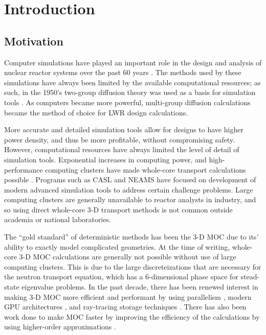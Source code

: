 \chapter{Introduction}{\label{ch:Introduction}
    \section{Motivation}{\label{sec:Introduction:Motivation}
        Computer simulations have played an important role in the design and analysis of nuclear reactor systems over the past 60 years \cite{FewGroupDiffusion}.
        The methods used by these simulations have always been limited by the available computational resources; as such, in the 1950's two-group diffusion theory was used as a basis for simulation tools \cite{FewGroupDiffusion}.
        As computers became more powerful, multi-group diffusion calculations became the method of choice for \ac{LWR} design calculations.

        More accurate and detailed simulation tools allow for designs to have higher power density, and thus be more profitable, without compromising safety.
        However, computational resources have always limited the level of detail of simulation tools.
        Exponential increases in computing power, and high-performance computing clusters have made whole-core transport calculations possible \cite{CASMO-4,Apollo2-2010,DeCART,Denovo,Yang2010,Boyd2014,Collins2016,Gunow2018}.
        Programs such as \ac{CASL} and \ac{NEAMS} have focused on development of modern advanced simulation tools to address certain challenge problems.
        Large computing clusters are generally unavailable to reactor analysts in industry, and so using direct whole-core 3-D transport methods is not common outside academia or national laboratories.

        The ``gold standard'' of deterministic methods has been the 3-D \ac{MOC} \cite{Askew1972} due to its' ability to exactly model complicated geometries.
        At the time of writing, whole-core 3-D \ac{MOC} calculations are generally not possible without use of large computing clusters.
        This is due to the large discreteizations that are necessary for the neutron transport equation, which has a 6-dimensional phase space for stead-state eigenvalue problems.
        In the past decade, there has been renewed interest in making 3-D \ac{MOC} more efficient and performant by using parallelism \cite{Kochunas2013}, modern \ac{GPU} architectures \cite{Boyd2014}, and ray-tracing storage techniques \cite{Sciannandrone2016, Gunow2016}.
        There has also been work done to make \ac{MOC} faster by improving the efficiency of the calculations by using higher-order approximations \cite{Ferrer2016,Gunow2018}.

}}
